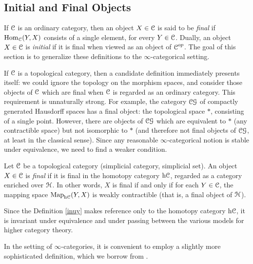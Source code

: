 \subsection{Initial and Final Objects}
\begin{1.2.12 Initial and final objects}
If $\operatorname{\mathcal{C}}$ is an ordinary category, then an object $X \in \operatorname{\mathcal{C}}$
is said to be {\it final} if $\operatorname{Hom}_{\operatorname{\mathcal{C}}}(Y,X)$ consists of a single element, for every $Y \in \operatorname{\mathcal{C}}$. Dually, an object $X \in \operatorname{\mathcal{C}}$ is {\it initial} if it is final when viewed as an object of $\operatorname{\mathcal{C}}^{op}$.
The goal of this section is to generalize these definitions to the $\infty$-categorical setting.

If $\operatorname{\mathcal{C}}$ is a topological category, then a candidate definition immediately presents itself: we could ignore the topology on the morphism spaces, and consider those objects of $\operatorname{\mathcal{C}}$ which are final when $\operatorname{\mathcal{C}}$ is regarded as an ordinary category. This requirement is unnaturally strong. For example, the category $\operatorname{\mathcal{C}\mathcal{G}}$ of compactly generated Hausdorff spaces has a final object: the topological space $\ast$, consisting of a single point. However, there are objects of $\operatorname{\mathcal{C}\mathcal{G}}$ which are equivalent to $\ast$ (any contractible space) but
not isomorphic to $\ast$ (and therefore not final objects of $\operatorname{\mathcal{C}\mathcal{G}}$, at least in the classical sense). Since any reasonable $\infty$-categorical notion is stable under equivalence, we need to find a weaker condition.

\begin{definition}\label{inuy}
Let $\operatorname{\mathcal{C}}$ be a topological category (simplicial category, simplicial set). An object $X \in \operatorname{\mathcal{C}}$ is {\it final} if it is final in the homotopy category
$\rm{h} \it{\operatorname{\mathcal{C}}}$, regarded as a category enriched over $\operatorname{\mathcal{H}}$. In other words, $X$ is final if and only if
for each $Y \in \operatorname{\mathcal{C}}$, the mapping space $\operatorname{{Map}}_{ \rm{h} \it{\operatorname{\mathcal{C}}}}(Y,X)$ is weakly contractible
(that is, a final object of $\operatorname{\mathcal{H}}$).
\end{definition}

\begin{remark}
Since the Definition \ref{inuy} makes reference only to the homotopy category $\rm{h} \it{\operatorname{\mathcal{C}}}$, it is invariant under equivalence and under passing between the various models for higher category theory.
\end{remark}

In the setting of $\infty$-categories, it is convenient to employ a slightly more
sophisticated definition, which we borrow from \cite{joyalpub}.


\end{1.2.12 Initial and final objects}

